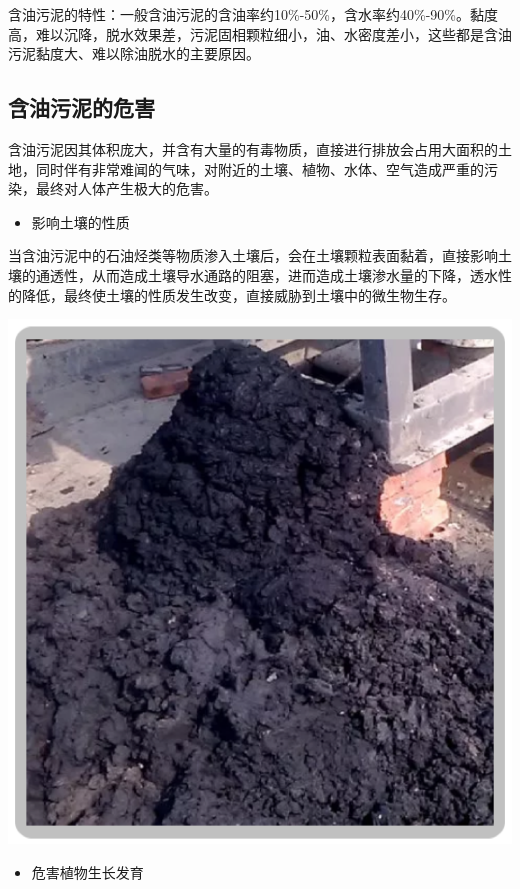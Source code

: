 \documentclass[
]{book}
\providecommand{\tightlist}{%
  \setlength{\itemsep}{0pt}\setlength{\parskip}{0pt}}
\begin{document}
含油污泥的特性：一般含油污泥的含油率约10\%-50\%，含水率约40\%-90\%。黏度高，难以沉降，脱水效果差，污泥固相颗粒细小，油、水密度差小，这些都是含油污泥黏度大、难以除油脱水的主要原因。

\hypertarget{ux542bux6cb9ux6c61ux6ce5ux7684ux5371ux5bb3}{%
\subsection{含油污泥的危害}\label{ux542bux6cb9ux6c61ux6ce5ux7684ux5371ux5bb3}}

含油污泥因其体积庞大，并含有大量的有毒物质，直接进行排放会占用大面积的土地，同时伴有非常难闻的气味，对附近的土壤、植物、水体、空气造成严重的污染，最终对人体产生极大的危害。

\begin{itemize}
\tightlist
\item
  影响土壤的性质
\end{itemize}

当含油污泥中的石油烃类等物质渗入土壤后，会在土壤颗粒表面黏着，直接影响土壤的通透性，从而造成土壤导水通路的阻塞，进而造成土壤渗水量的下降，透水性的降低，最终使土壤的性质发生改变，直接威胁到土壤中的微生物生存。

\includegraphics[width=8in]{images/youni4}

\begin{itemize}
\tightlist
\item
  危害植物生长发育
\end{itemize}
\end{document}
